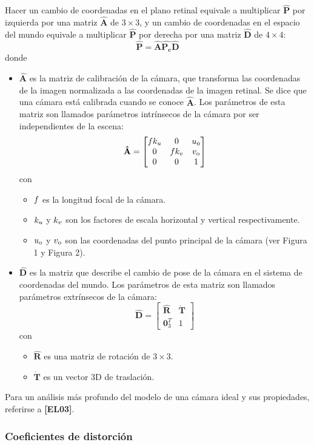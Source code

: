 \documentclass[11pt,a4paper,titlepage]{article}
\newcommand{\Cite}[1]{\textbf{[#1]}}
\newcommand{\Scalar}[1]{\ensuremath{\mathnormal{#1}}}
\newcommand{\Mat}[1]{\ensuremath{\mathbf{\hat{#1}}}}
\newcommand{\ThreeCart}[1]{\ensuremath{\mathbf{\dot{#1}}}}
\newcommand{\Figure}[1]{Figura #1}
\begin{document}
Hacer un cambio de coordenadas en el plano retinal equivale a multiplicar \Mat{P} por izquierda por una matriz \Mat{A} de $3 \times 3$, y un cambio de coordenadas en el espacio del mundo equivale a multiplicar \Mat{P} por derecha por una matriz \Mat{D} de $4 \times 4$:
\[
	\Mat{P} = \Mat{A}\Mat{P_c}\Mat{D}
\]
donde
\begin{itemize}
	\item \Mat{A} es la matriz de calibración de la cámara, que transforma las coordenadas de la imagen normalizada a las coordenadas de la imagen retinal. Se dice que una cámara está calibrada cuando se conoce \Mat{A}. Los parámetros de esta matriz son llamados parámetros intrínsecos de la cámara por ser independientes de la escena:
	\[
		\Mat{A} =
		\begin{bmatrix}
			\Scalar{f} \Scalar{k_u} & 0 & \Scalar{u_0} \\
			0 & \Scalar{f} \Scalar{k_v} & \Scalar{v_0} \\
			0 & 0 & 1
		\end{bmatrix}
	\]
	con
	\begin{itemize}
		\item \Scalar{f} es la longitud focal de la cámara.
		\item \Scalar{k_u} y \Scalar{k_v} son los factores de escala horizontal y vertical respectivamente.
		\item \Scalar{u_0} y \Scalar{v_0} son las coordenadas del punto principal de la cámara (ver \Figure{1} y \Figure{2}).
	\end{itemize}
	\item \Mat{D} es la matriz que describe el cambio de pose de la cámara en el sistema de coordenadas del mundo. Los parámetros de esta matriz son llamados parámetros extrínsecos de la cámara:
	\[
		\Mat{D} =
		\begin{bmatrix}
			\Mat{R} & \ThreeCart{T} \\
			\mathbf{0}^T_3 & 1
		\end{bmatrix}
	\]
	con
	\begin{itemize}
		\item \Mat{R} es una matriz de rotación de $3 \times 3$.
		\item \ThreeCart{T} es un vector 3D de traslación.
	\end{itemize}
\end{itemize}

Para un análisis más profundo del modelo de una cámara ideal y sus propiedades, referirse a \Cite{EL03}.

\subsubsection{Coeficientes de distorción}
\end{document}
